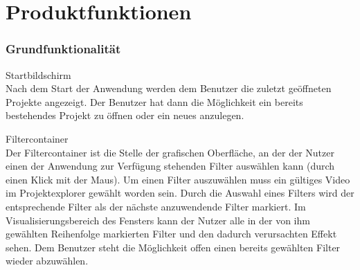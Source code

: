 \chapter {Produktfunktionen}

\subsection{Grundfunktionalität}
\setcounter{counterKriterien}{0}

 Startbildschirm \\
Nach dem Start der Anwendung werden dem Benutzer die zuletzt geöffneten Projekte angezeigt. Der Benutzer
hat dann die Möglichkeit ein bereits bestehendes Projekt zu öffnen oder ein neues anzulegen.
 
 Filtercontainer \\
Der Filtercontainer ist die Stelle der grafischen Oberfläche, an der der Nutzer einen der Anwendung
zur Verfügung stehenden Filter auswählen kann (durch einen Klick mit der Maus). Um einen Filter auszuwählen
muss ein gültiges Video im Projektexplorer gewählt worden sein. Durch die Auswahl eines Filters wird
der entsprechende Filter als der nächste anzuwendende Filter markiert. Im Visualisierungsbereich des
Fensters kann der Nutzer alle in der von ihm gewählten Reihenfolge markierten Filter und den
dadurch verursachten Effekt sehen. Dem Benutzer steht die Möglichkeit offen einen bereits gewählten
Filter wieder abzuwählen.

